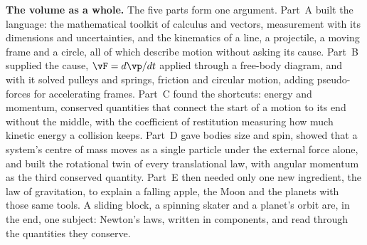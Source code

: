 \medskip
\textbf{The volume as a whole.} The five parts form one argument. Part~A built the language: the
mathematical toolkit of calculus and vectors, measurement with its dimensions and uncertainties, and the
kinematics of a line, a projectile, a moving frame and a circle, all of which describe motion without
asking its cause. Part~B supplied the cause, $\vF=d\vp/dt$ applied through a free-body diagram, and with
it solved pulleys and springs, friction and circular motion, adding pseudo-forces for accelerating frames.
Part~C found the shortcuts: energy and momentum, conserved quantities that connect the start of a motion
to its end without the middle, with the coefficient of restitution measuring how much kinetic energy a
collision keeps. Part~D gave bodies size and spin, showed that a system's centre of mass moves as a single particle
under the external force alone, and built the rotational twin of every translational law, with angular momentum as the third
conserved quantity. Part~E then needed only one new ingredient, the law of gravitation, to explain a
falling apple, the Moon and the planets with those same tools. A sliding block, a spinning skater and a
planet's orbit are, in the end, one subject: Newton's laws, written in components, and read through the
quantities they conserve.
